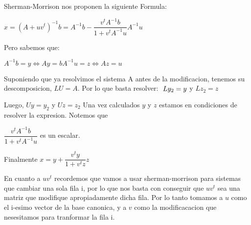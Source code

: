 Sherman-Morrison nos proponen la siguiente Formula:

$x = (A + uv^{t})^{-1} b = A^{-1}b -  \dfrac{v^{t}A^{-1}b}{1+v^{t}A^{-1}u} A^{-1}u$

Pero sabemos que:

$A^{-1}b = y \iff Ay = b 
A^{-1}u = z \iff Az = u $

Suponiendo que ya resolvimos el sistema A antes de la modificacion, tenemos su descomposicion, $ LU=A $. Por lo que basta resolver: $\\\
Ly_{2} = y $ y $ Lz_{2}=z$

Luego, $ Uy=y_{2} $ y $ Uz=z_{2}$
Una vez calculados $ y $ y $ z $ estamos en condiciones de resolver la expresion. Notemos que

$ \dfrac{v^{t}A^{-1}b}{1+v^{t}A^{-1}u} $ es un escalar.

Finalmente $ x = y +  \dfrac{v^{t}y}{1+v^{t}z} z$


En cuanto a $ uv^{t} $ recordemos que vamos a usar sherman-morrison para sistemas que cambiar una sola fila i, por lo que nos basta con
conseguir que $ uv^{t} $ sea una matriz que modifique apropiadamente dicha fila. Por lo tanto tomamos a $u$ como el i-esimo vector de la base canonica,
y a $v$ como la modificacacion que nesesitamos para tranformar la fila i.








